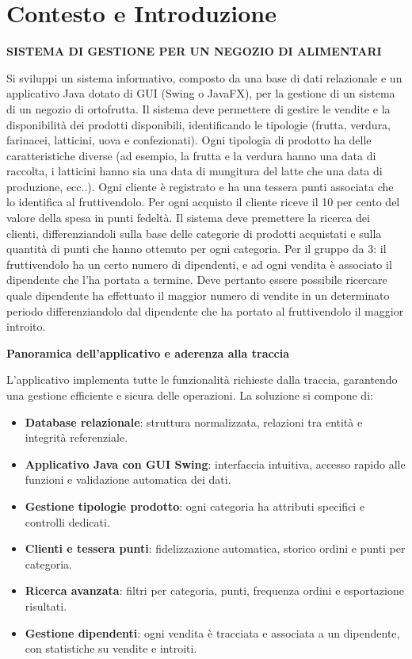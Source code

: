 \documentclass[a4paper,12pt]{article}
\begin{document}
\section{Contesto e Introduzione}
\begin{tcolorbox}[colback=gray!10, colframe=black!40!black, title=Presentazione della traccia]
\textbf{SISTEMA DI GESTIONE PER UN NEGOZIO DI ALIMENTARI}

Si sviluppi un sistema informativo, composto da una base di dati relazionale e un applicativo Java dotato di
GUI (Swing o JavaFX), per la gestione di un sistema di un negozio di ortofrutta. Il sistema deve permettere di
gestire le vendite e la disponibilità dei prodotti disponibili, identificando le tipologie (frutta, verdura,
farinacei, latticini, uova e confezionati). Ogni tipologia di prodotto ha delle caratteristiche diverse (ad
esempio, la frutta e la verdura hanno una data di raccolta, i latticini hanno sia una data di mungitura del latte
che una data di produzione, ecc..). Ogni cliente è registrato e ha una tessera punti associata che lo identifica
al fruttivendolo. Per ogni acquisto il cliente riceve il 10 per cento del valore della spesa in punti fedeltà. Il sistema
deve premettere la ricerca dei clienti, differenziandoli sulla base delle categorie di prodotti acquistati e sulla
quantità di punti che hanno ottenuto per ogni categoria.
Per il gruppo da 3: il fruttivendolo ha un certo numero di dipendenti, e ad ogni vendita è associato il
dipendente che l’ha portata a termine. Deve pertanto essere possibile ricercare quale dipendente ha
effettuato il maggior numero di vendite in un determinato periodo differenziandolo dal dipendente che ha
portato al fruttivendolo il maggior introito.

\end{tcolorbox}

\vspace{0.5em}
\noindent\textbf{Panoramica dell'applicativo e aderenza alla traccia}

L'applicativo implementa tutte le funzionalità richieste dalla traccia, garantendo una gestione efficiente e sicura delle operazioni. La soluzione si compone di:
\begin{itemize}
    \item \textbf{Database relazionale}: struttura normalizzata, relazioni tra entità e integrità referenziale.
    \item \textbf{Applicativo Java con GUI Swing}: interfaccia intuitiva, accesso rapido alle funzioni e validazione automatica dei dati.
    \item \textbf{Gestione tipologie prodotto}: ogni categoria ha attributi specifici e controlli dedicati.
    \item \textbf{Clienti e tessera punti}: fidelizzazione automatica, storico ordini e punti per categoria.
    \item \textbf{Ricerca avanzata}: filtri per categoria, punti, frequenza ordini e esportazione risultati.
    \item \textbf{Gestione dipendenti}: ogni vendita è tracciata e associata a un dipendente, con statistiche su vendite e introiti.
\end{itemize}
\end{document}
